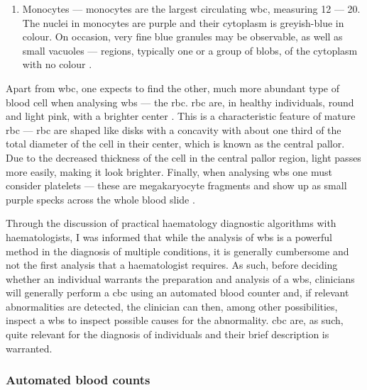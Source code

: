 \begin{enumerate}
    \item{Monocytes} --- monocytes are the largest circulating \ac{wbc}, measuring 12 --- 20\Mum. The nuclei in monocytes are purple and their cytoplasm is greyish-blue in colour. On occasion, very fine blue granules may be observable, as well as small vacuoles --- regions, typically one or a group of blobs, of the cytoplasm with no colour \cite{Bain2014-oc}.
\end{enumerate}

\begin{figure}[H]
	\label{fig:blood-cell-examples}
\end{figure}

Apart from \ac{wbc}, one expects to find the other, much more abundant type of blood cell when analysing \ac{wbs} --- the \ac{rbc}. \ac{rbc} are, in healthy individuals, round and light pink, with a brighter center \cite{Bain2014-oc}. This is a characteristic feature of mature \ac{rbc} --- \ac{rbc} are shaped like disks with a concavity with about one third of the total diameter of the cell in their center, which is known as the central pallor. Due to the decreased thickness of the cell in the central pallor region, light passes more easily, making it look brighter. Finally, when analysing \ac{wbs} one must consider platelets --- these are megakaryocyte fragments and show up as small purple specks across the whole blood slide \cite{Bain2014-oc,Wright1906-af}.

Through the discussion of practical haematology diagnostic algorithms with haematologists, I was informed that while the analysis of \ac{wbs} is a powerful method in the diagnosis of multiple conditions, it is generally cumbersome and not the first analysis that a haematologist requires. As such, before deciding whether an individual warrants the preparation and analysis of a \ac{wbs}, clinicians will generally perform a \ac{cbc} using an automated blood counter and, if relevant abnormalities are detected, the clinician can then, among other possibilities, inspect a \ac{wbs} to inspect possible causes for the abnormality. \ac{cbc} are, as such, quite relevant for the diagnosis of individuals and their brief description is warranted.

\subsubsection{Automated blood counts}

